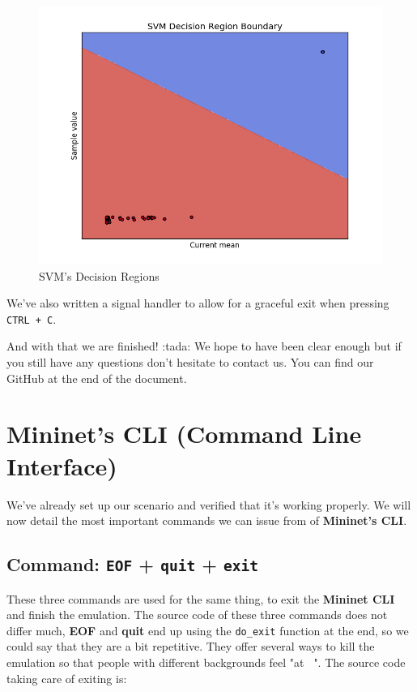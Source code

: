 \documentclass[12pt]{report}
\newcommand{\newpar} {
    \vskip 1cm
}
\begin{document}
\begin{itemize}
{{{{				\begin{figure}
					\centering
					\includegraphics[scale = 1]{svm_graph.png}
					\caption{SVM's Decision Regions}
					\label{f:svm_graph}
				\end{figure}

				We've also written a signal handler to allow for a graceful exit when pressing \texttt{CTRL + C}.
				\newpar
				And with that we are finished! :tada: We hope to have been clear enough but if you still have any questions don't hesitate to contact us. You can find our GitHub at the end of the document.

	\section{Mininet's CLI (\textbf{C}ommand \textbf{L}ine \textbf{I}nterface)}
		We've already set up our scenario and verified that it's working properly. We will now detail the most important commands we can issue from of \textbf{Mininet's CLI}.

		\subsection{Command: \texttt{EOF} + \texttt{quit} + \texttt{exit}}
			These three commands are used for the same thing, to exit the \textbf{Mininet CLI} and finish the emulation. The source code of these three commands does not differ much, \textbf{EOF} and \textbf{quit} end up using the \texttt{do_exit} function at the end, so we could say that they are a bit repetitive. They offer several ways to kill the emulation so that people with different backgrounds feel "at \texttt{~}". The source code taking care of exiting is:

}}}}
\end{itemize}
\end{document}
